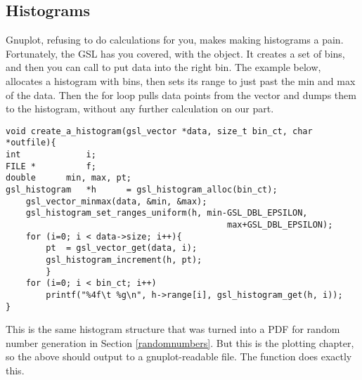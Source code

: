 \subsection{Histograms} Gnuplot, refusing to do calculations for you,
makes making histograms a pain.  Fortunately, the GSL has you covered,
with the  object. It creates a set of bins, and
then you can call  to put
data into the right bin. The example below, allocates a histogram with
 bins, then sets its range to just past the min and max
of the data. Then the for loop pulls data points from the vector and
dumps them to the histogram, without any further calculation on our part.

\begin{lstlisting}
void create_a_histogram(gsl_vector *data, size_t bin_ct, char *outfile){
int             i;
FILE *          f;
double      min, max, pt;
gsl_histogram   *h      = gsl_histogram_alloc(bin_ct);
    gsl_vector_minmax(data, &min, &max);
    gsl_histogram_set_ranges_uniform(h, min-GSL_DBL_EPSILON, 
                                            max+GSL_DBL_EPSILON);
    for (i=0; i < data->size; i++){
        pt  = gsl_vector_get(data, i);
        gsl_histogram_increment(h, pt);
        }
    for (i=0; i < bin_ct; i++)
        printf("%4f\t %g\n", h->range[i], gsl_histogram_get(h, i));
}
\end{lstlisting}

This is the same histogram structure that was turned into a PDF for
random number generation in Section \ref{randomnumbers}.
But this is the plotting chapter, so the above should output to
a gnuplot-readable file. The 
function does exactly this.

